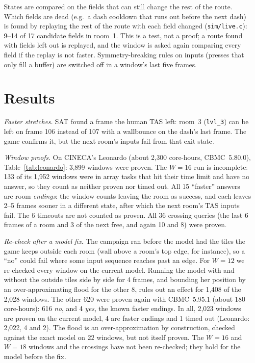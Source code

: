 \documentclass[conference]{IEEEtran}
\newcommand{\code}[1]{\texttt{#1}}
\begin{document}
States are compared on the fields that can still change the rest of the
route. Which fields are dead (e.g.\ a dash cooldown that runs out before the
next dash) is found by replaying the rest of the route with each field
changed (\code{sim/live.c}): 9--14 of 17 candidate fields in room~1. This is
a test, not a proof; a route found with fields left out is replayed, and the
window is asked again comparing every field if the replay is not faster.
Symmetry-breaking rules on inputs (presses that only fill a buffer) are
switched off in a window's last five frames.

\section{Results}
\emph{Faster stretches.} SAT found a frame the human TAS left: room~3
(\code{lvl\_3}) can be left on frame 106 instead of 107 with a wallbounce on
the dash's last frame. The game confirms it, but the next room's inputs fail
from that exit state.

\emph{Window proofs.} On CINECA's Leonardo (about 2,300 core-hours,
CBMC~5.80.0), Table~\ref{tab:leonardo}: 3,899 windows were proven. The
$W{=}16$ run is incomplete: 133 of its 1,952 windows were in array tasks that
hit their time limit and have no answer, so they count as neither proven nor
timed out. All 15
``faster'' answers are room \emph{endings}: the window counts leaving the
room as success, and each leaves 2--5 frames sooner in a different state,
after which the next room's TAS inputs fail. The 6 timeouts are not
counted as proven. All 36 crossing queries (the last 6 frames of a room and
3 of the next free, and again 10 and 8) were proven.

\emph{Re-check after a model fix.} The campaign ran before the model had the
tiles the game keeps outside each room (wall above a room's top edge, for
instance), so a ``no'' could fail where some input sequence reaches past an
edge. For $W{=}12$ we re-checked every window on the current model. Running
the model with and without the outside tiles side by side for 4 frames, and
bounding her position by an over-approximating flood for the other 8, rules
out an effect for 1,408 of the 2,028 windows. The other 620 were proven again
with CBMC~5.95.1 (about 180 core-hours): 616 \emph{no}, and 4 \emph{yes}, the
known faster endings. In all, 2,023 windows are proven on the current model,
4 are faster endings and 1 timed out (Leonardo: 2,022, 4 and 2). The flood is
an over-approximation by construction, checked against the exact model on 22
windows, but not itself proven. The $W{=}16$ and $W{=}18$ windows and the
crossings have not been re-checked; they hold for the model before the fix.
\end{document}
